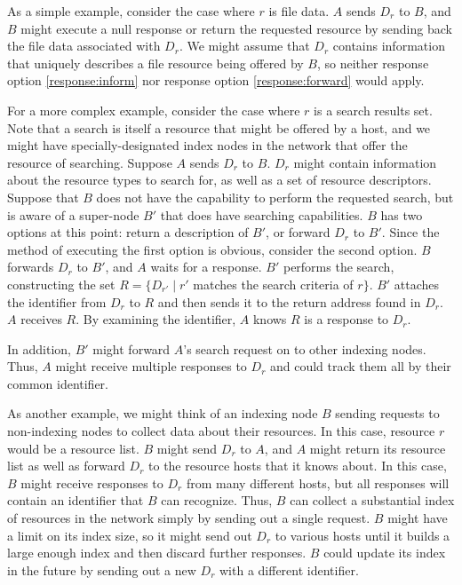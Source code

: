 \documentclass[12pt]{article}
\begin{document}
As a simple example, consider the case where $r$ is file data.  $A$ sends $D_r$ to $B$, and $B$ might execute a null response or return the requested resource by sending back the file data associated with $D_r$.  We might assume that $D_r$ contains information that uniquely describes a file resource being offered by $B$, so neither response option \ref{response:inform} nor response option \ref{response:forward} would apply.

For a more complex example, consider the case where $r$ is a search results set.  Note that a search is itself a resource that might be offered by a host, and we might have specially-designated index nodes in the network that offer the resource of searching.  Suppose $A$ sends $D_r$ to $B$.  $D_r$ might contain information about the resource types to search for, as well as a set of resource descriptors.  Suppose that $B$ does not have the capability to perform the requested search, but is aware of a super-node $B'$ that does have searching capabilities.  $B$ has two options at this point:  return a description of $B'$, or forward $D_r$ to $B'$.  Since the method of executing the first option is obvious, consider the second option.  $B$ forwards $D_r$ to $B'$, and $A$ waits for a response.  $B'$ performs the search, constructing the set $R = \{D_{r'} \mid r'$ matches the search criteria of $r \}$.  $B'$ attaches the identifier from $D_r$ to $R$ and then sends it to the return address found in $D_r$.  $A$ receives $R$.  By examining the identifier, $A$ knows $R$ is a response to $D_r$.  

In addition, $B'$ might forward $A$'s search request on to other indexing nodes.  Thus, $A$ might receive multiple responses to $D_r$ and could track them all by their common identifier.

As another example, we might think of an indexing node $B$ sending requests to non-indexing nodes to collect data about their resources.  In this case, resource $r$ would be a resource list.  $B$ might send $D_r$ to $A$, and $A$ might return its resource list as well as forward $D_r$ to the resource hosts that it knows about.  In this case, $B$ might receive responses to $D_r$ from many different hosts, but all responses will contain an identifier that $B$ can recognize.  Thus, $B$ can collect a substantial index of resources in the network simply by sending out a single request.  $B$ might have a limit on its index size, so it might send out $D_r$ to various hosts until it builds a large enough index and then discard further responses.  $B$ could update its index in the future by sending out a new $D_r$ with a different identifier.
\end{document}
